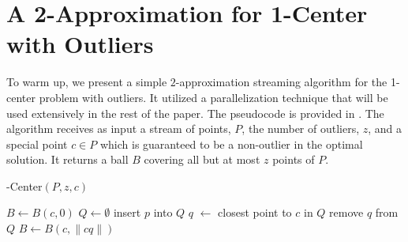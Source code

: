 \documentclass[envcountsame]{cls/cccg15}
\DeclareMathOperator*{\argmin}{arg\,min}
\newcommand{\textproc}{\textsc}
\newcommand{\Call}[2]{\textsc{#1}(#2)}
\newcommand{\set}[1]{\left\{ #1 \right\}}
\newcommand{\len}[1]{\|{#1}\|}
\begin{document}

\section{A 2-Approximation for 1-Center with Outliers}
\label{sec:1-center}

To warm up, we present a simple $2$-approximation streaming algorithm
for the 1-center problem with outliers.
It utilized a parallelization technique that 
will be used extensively in the rest of the paper.
The pseudocode is provided in .
The algorithm receives as input a stream of points, $P$,
the number of outliers, $z$, 
and a special point $c \in P$ which is guaranteed to be 
a non-outlier in the optimal solution.
It returns a ball $B$ covering all but at most $z$ points of $P$.

%
%

\begin{algorithm}
\caption{-Center$(P, z, c)$} 
\label{alg:1-center}
\begin{algorithmic}[1]
	\STATE $B \gets B(c, 0)$
	\STATE $Q \gets \emptyset$
			\STATE insert $p$ into $Q$
				\STATE $q$ $\gets$ closest point to $c$ in $Q$
				\STATE remove $q$ from $Q$
				\STATE $B \gets B(c, \len{cq})$
			\ENDIF
		\ENDIF
	\ENDFOR
\end{algorithmic}
\end{algorithm}

\end{document}
